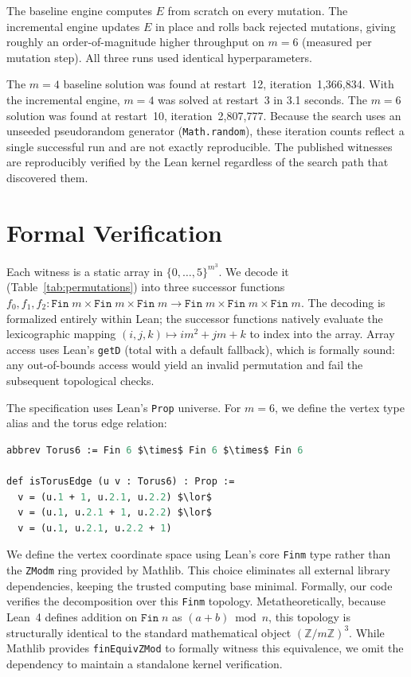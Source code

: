 \documentclass[11pt]{article}
\theoremstyle{plain}
\begin{document}
The baseline engine computes $E$ from scratch on every mutation. The
incremental engine updates $E$ in place and rolls back rejected mutations,
giving roughly an order-of-magnitude higher throughput on $m=6$
(measured per mutation step). All three runs used identical hyperparameters.

The $m=4$ baseline solution was found at restart~12, iteration~1{,}366{,}834.
With the incremental engine, $m=4$ was solved at restart~3 in 3.1 seconds.
The $m=6$ solution was found at restart~10, iteration~2{,}807{,}777.
Because the search uses an unseeded pseudorandom generator
(\texttt{Math.random}), these iteration counts reflect a single
successful run and are not exactly reproducible. The published
witnesses are reproducibly verified by the Lean kernel regardless
of the search path that discovered them.

\section{Formal Verification}

Each witness is a static array in $\{0,\ldots,5\}^{m^3}$. We decode it
(Table~\ref{tab:permutations}) into three successor functions
$f_0, f_1, f_2 :
\texttt{Fin}\;m \times \texttt{Fin}\;m \times \texttt{Fin}\;m \to
\texttt{Fin}\;m \times \texttt{Fin}\;m \times \texttt{Fin}\;m$.
The decoding is formalized entirely within Lean; the successor
functions natively evaluate the lexicographic mapping
$(i,j,k) \mapsto im^2 + jm + k$ to index into the array.
Array access uses Lean's \texttt{getD} (total with a default
fallback), which is formally sound: any out-of-bounds access
would yield an invalid permutation and fail the subsequent
topological checks.

The specification uses Lean's \texttt{Prop} universe. For $m=6$, we
define the vertex type alias and the torus edge relation:
\begin{lstlisting}[language=ML,mathescape=true]
abbrev Torus6 := Fin 6 $\times$ Fin 6 $\times$ Fin 6

def isTorusEdge (u v : Torus6) : Prop :=
  v = (u.1 + 1, u.2.1, u.2.2) $\lor$
  v = (u.1, u.2.1 + 1, u.2.2) $\lor$
  v = (u.1, u.2.1, u.2.2 + 1)
\end{lstlisting}
We define the vertex coordinate space using Lean's core
\texttt{Fin\;m} type rather than the \texttt{ZMod\;m} ring provided by
Mathlib. This choice eliminates all external library dependencies,
keeping the trusted computing base minimal. Formally, our code verifies
the decomposition over this \texttt{Fin\;m} topology.
Metatheoretically, because Lean~4 defines addition on $\texttt{Fin}\;n$
as $(a + b) \bmod n$, this topology is structurally identical to the
standard mathematical object $(\mathbb{Z}/m\mathbb{Z})^3$. While
Mathlib provides \texttt{finEquivZMod} to formally witness this
equivalence, we omit the dependency to maintain a standalone kernel
verification.
\end{document}

